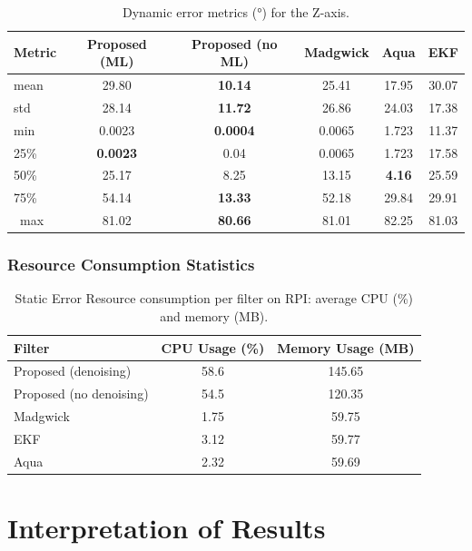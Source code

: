 \documentclass{iutbscthesis}
\begin{document}
\begin{table}[H]
\centering
\scriptsize
\caption{Dynamic error metrics (°) for the Z-axis.}
\label{tab:dynamic_z}
\begin{tabular}{lccccc}
\toprule
Metric & Proposed (ML) & Proposed (no ML) & Madgwick & Aqua & EKF \\
\midrule
mean & 29.80 & \textbf{10.14} & 25.41 & 17.95 & 30.07 \\
std & 28.14 & \textbf{11.72} & 26.86 & 24.03 & 17.38 \\
min & 0.0023& \textbf{0.0004} & 0.0065& 1.723 & 11.37 \\
25\% & \textbf{0.0023} & 0.04 & 0.0065& 1.723 & 17.58 \\
50\% & 25.17 & 8.25 & 13.15 & \textbf{4.16} & 25.59 \\
75\% & 54.14 & \textbf{13.33} & 52.18 & 29.84 & 29.91 \\\
max & 81.02 & \textbf{80.66} & 81.01 & 82.25 & 81.03 \\
\bottomrule
\end{tabular}
\end{table}


\subsection{Resource Consumption Statistics}
\begin{table}[H]
  \centering
  \caption{Static Error Resource consumption per filter on RPI: average CPU (\%) and memory (MB).}
  \label{tab:resource_consumption_static}
  \begin{tabular}{lcc}
    \toprule
    Filter & CPU Usage (\%) & Memory Usage (MB) \\
    \midrule
    Proposed (denoising)     & 58.6 & 145.65 \\
    Proposed (no denoising)    & 54.5 & 120.35 \\
    Madgwick           & 1.75 & 59.75 \\
    EKF                & 3.12 & 59.77 \\
    Aqua               & 2.32 & 59.69 \\
    \bottomrule
  \end{tabular}
\end{table}



\chapter{Interpretation of Results} \label{chapter:discussion}
\end{document}
